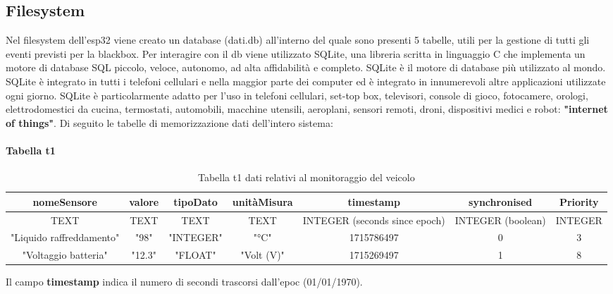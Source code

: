 \documentclass[12pt, a4paper, italian]{report}
\numberwithin{figure}{chapter}
\numberwithin{table}{chapter}
\begin{document}
\subsection{Filesystem}
Nel filesystem dell'esp32 viene creato un database (dati.db) all'interno del quale sono presenti 5 tabelle, utili per la gestione di tutti gli eventi previsti per la blackbox. Per interagire con il db viene utilizzato SQLite, una libreria scritta in linguaggio C che implementa un motore di database SQL piccolo, veloce, autonomo, ad alta affidabilità e completo. SQLite è il motore di database più utilizzato al mondo. SQLite è integrato in tutti i telefoni cellulari e nella maggior parte dei computer ed è integrato in innumerevoli altre applicazioni utilizzate ogni giorno. SQLite è particolarmente adatto per l'uso in telefoni cellulari, set-top box, televisori, console di gioco, fotocamere, orologi, elettrodomestici da cucina, termostati, automobili, macchine utensili, aeroplani, sensori remoti, droni, dispositivi medici e robot: \textbf{"internet of things"}.
Di seguito le tabelle di memorizzazione dati dell'intero sistema:

\paragraph{Tabella t1}
\begin{table}[h!]
  \centering 
  \begin{adjustbox}{max width=\textwidth}
    \begin{tabular}{|c|c|c|c|c|c|c|}
      \hline
      \textbf{nomeSensore} & \textbf{valore} & \textbf{tipoDato} & \textbf{unitàMisura} & \textbf{timestamp} & \textbf{synchronised} & \textbf{Priority} \\
      \hline
      TEXT & TEXT & TEXT & TEXT & INTEGER (seconds since epoch) & INTEGER (boolean) & INTEGER \\
      \hline
      "Liquido raffreddamento" & "98" & "INTEGER" & "°C" & 1715786497 & 0 & 3 \\
      \hline
      "Voltaggio batteria" & "12.3" & "FLOAT" & "Volt (V)" & 1715269497 & 1 & 8 \\
      \hline
    \end{tabular}
  \end{adjustbox}
  \caption{Tabella t1 dati relativi al monitoraggio del veicolo}
  \label{tab:t1 monitoraggio}
\end{table}
Il campo \textbf{timestamp} indica il numero di secondi trascorsi dall'epoc (01/01/1970).
\end{document}
